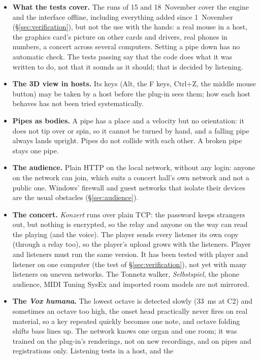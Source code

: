 \documentclass[11pt,a4paper,parskip=half,DIV=11,toc=bibliography]{scrartcl}
\newcommand{\ui}[1]{\emph{#1}}                 %
\begin{document}
\begin{itemize}
  \item \textbf{What the tests cover.} The runs of 15 and 18~November cover the engine and the interface offline, including everything added
        since 1~November (\S\ref{sec:verification}), but not the use with the hands: a real mouse in a host, the graphics card's picture on other
        cards and drivers, real phones in numbers, a concert across several computers. Setting a pipe down has no automatic check. The tests passing say that the code does what it
        was written to do, not that it sounds as it should; that is decided by listening.
  \item \textbf{The 3D view in hosts.} Its keys (Alt, the F keys, Ctrl+Z, the middle mouse button) may be taken by a host before the plug-in sees
        them; how each host behaves has not been tried systematically.
  \item \textbf{Pipes as bodies.} A pipe has a place and a velocity but no orientation: it does not tip over or spin, so it cannot be turned by
        hand, and a falling pipe always lands upright. Pipes do not collide with each other. A broken pipe stays one pipe.
  \item \textbf{The audience.} Plain HTTP on the local network, without any login: anyone on the network can join, which suits a concert
        hall's own network and not a public one. Windows' firewall and guest networks that isolate their devices are the usual obstacles
        (\S\ref{sec:audience}).
  \item \textbf{The concert.} \ui{Konzert} runs over plain TCP: the password keeps strangers out, but nothing is encrypted, so the relay and anyone
        on the way can read the playing (and the voice). The player sends every listener its own copy (through a relay too), so the player's upload
        grows with the listeners. Player and listeners must run the same version. It has been tested with player and listener on one computer
        (the test of \S\ref{sec:verification}), not yet with many listeners on uneven networks. The Tonnetz walker, \ui{Selbstspiel}, the phone audience,
        MIDI Tuning SysEx and imported room models are not mirrored.
  \item \textbf{The \ui{Vox humana}.} The lowest octave is detected slowly (\SI{33}{ms} at C2) and sometimes an octave too high, the onset head practically
        never fires on real material, so a key repeated quickly becomes one note, and octave folding shifts bass lines up. The network knows one organ and
        one room; it was trained on the plug-in's renderings, not on new recordings, and on pipes and registrations only. Listening tests in a host, and the

\end{itemize}
\end{document}
